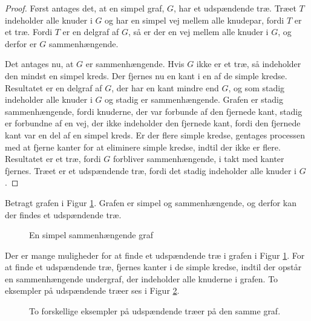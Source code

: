 \begin{proof}
Først antages det, at en simpel graf, $G$, har et udspændende træ. 
Træet $T$ indeholder alle knuder i $G$ og har en simpel vej mellem alle knudepar, fordi $T$ er et træ. 
Fordi $T$ er en delgraf af $G$, så er der en vej mellem alle knuder i $G$, og derfor er $G$ sammenhængende.

Det antages nu, at $G$ er sammenhængende. Hvis $G$ ikke er et træ, så indeholder den mindst en simpel kreds. 
Der fjernes nu en kant i en af de simple kredse. 
Resultatet er en delgraf af $G$, der har en kant mindre end $G$, og som stadig indeholder alle knuder i $G$ og stadig er sammenhængende. 
Grafen er stadig sammenhængende, fordi knuderne, der var forbunde af den fjernede kant, stadig er forbundne af en vej, der ikke indeholder den fjernede kant, fordi den fjernede kant var en del af en simpel kreds. 
Er der flere simple kredse, gentages processen med at fjerne kanter for at eliminere simple kredse, indtil der ikke er flere. 
Resultatet er et træ, fordi $G$ forbliver sammenhængende, i takt med kanter fjernes. Træet er et udspændende træ, fordi det stadig indeholder alle knuder i $G$.
\end{proof}

\begin{exmp}
Betragt grafen i Figur \ref{eksempel_udspaendende}. Grafen er simpel og sammenhængende, og derfor kan der findes et udspændende træ. 

\begin{figure}[h]
\centering

\caption{En simpel sammenhængende graf} 
\label{eksempel_udspaendende}
\end{figure}

Der er mange muligheder for at finde et udspændende træ i grafen i Figur \ref{eksempel_udspaendende}. For at finde et udspændende træ, fjernes kanter i de simple kredse, indtil der opstår en sammenhængende undergraf, der indeholder alle knuderne i grafen. To eksempler på udspændende træer ses i Figur \ref{eksempel_udspaendende1}.

\begin{figure}[!htb]
	\centering
	\begin{minipage}[c]{0.45\linewidth}
		\centering
		
	\end{minipage}
	\begin{minipage}[c]{.45\linewidth}
		\centering
		
	\end{minipage}
	\caption{To forskellige eksempler på udspændende træer på den samme graf.} \label{eksempel_udspaendende1}
\end{figure}

\end{exmp}

